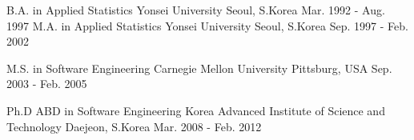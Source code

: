 

\begin{cventries}

  \cventry
    {B.A. in Applied Statistics} %
    {Yonsei University} %
    {Seoul, S.Korea} %
    {Mar. 1992 - Aug. 1997} %
    {
    }
  \cventry
    {M.A. in Applied Statistics} %
    {Yonsei University} %
    {Seoul, S.Korea} %
    {Sep. 1997 - Feb. 2002} %
  { 
  }

  \cventry
    {M.S. in Software Engineering} %
    {Carnegie Mellon University} %
    {Pittsburg, USA} %
    {Sep. 2003 - Feb. 2005} %
  { 
  }

  \cventry
    {Ph.D ABD in Software Engineering} %
    {Korea Advanced Institute of Science and Technology} %
    {Daejeon, S.Korea} %
    {Mar. 2008 - Feb. 2012} %
  { 
  }

\end{cventries}
